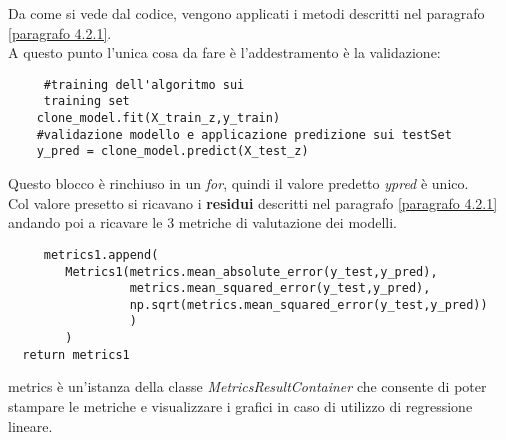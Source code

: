 Da come si vede dal codice, vengono applicati i metodi descritti nel paragrafo \ref{paragrafo 4.2.1}. \\
A questo punto l'unica cosa da fare è l'addestramento è la validazione:
\begin{lstlisting}
     #training dell'algoritmo sui 
     training set
    clone_model.fit(X_train_z,y_train)
    #validazione modello e applicazione predizione sui testSet
    y_pred = clone_model.predict(X_test_z)
\end{lstlisting}
Questo blocco è rinchiuso in un \textit{for}, quindi il valore predetto \textit{ypred} è unico. \\
Col valore presetto si ricavano i \textbf{residui} descritti nel paragrafo \ref{paragrafo 4.2.1} andando poi a ricavare le 3 metriche di valutazione dei modelli.

\begin{lstlisting}
     metrics1.append(
        Metrics1(metrics.mean_absolute_error(y_test,y_pred),
                 metrics.mean_squared_error(y_test,y_pred),
                 np.sqrt(metrics.mean_squared_error(y_test,y_pred))
                 )
        )
  return metrics1
\end{lstlisting}
metrics è un'istanza della classe \textit{MetricsResultContainer} che consente di poter stampare le metriche e visualizzare i grafici in caso di utilizzo di regressione lineare. \\